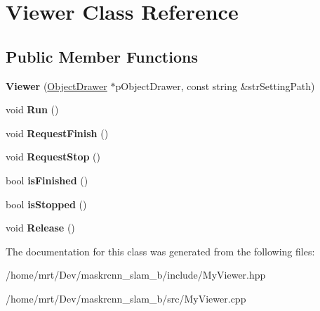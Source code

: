 \hypertarget{classViewer}{}\section{Viewer Class Reference}
\label{classViewer}
\subsection*{Public Member Functions}
\begin{DoxyCompactItemize}
\item 
{\bfseries Viewer} (\hyperlink{classObjectDrawer}{Object\+Drawer} $\ast$p\+Object\+Drawer, const string \&str\+Setting\+Path)\hypertarget{classViewer_a530a83e4c12b0696bcf13edbe3c44b7a}{}\label{classViewer_a530a83e4c12b0696bcf13edbe3c44b7a}

\item 
void {\bfseries Run} ()\hypertarget{classViewer_a3d4222d62773f3e5fc76549802904881}{}\label{classViewer_a3d4222d62773f3e5fc76549802904881}

\item 
void {\bfseries Request\+Finish} ()\hypertarget{classViewer_ad38e3739f5cc89f659c04a66eadf038a}{}\label{classViewer_ad38e3739f5cc89f659c04a66eadf038a}

\item 
void {\bfseries Request\+Stop} ()\hypertarget{classViewer_a018381d2908442c9bbe507ebb07cee39}{}\label{classViewer_a018381d2908442c9bbe507ebb07cee39}

\item 
bool {\bfseries is\+Finished} ()\hypertarget{classViewer_a2639be157c5d30ac92f95addf50f57b8}{}\label{classViewer_a2639be157c5d30ac92f95addf50f57b8}

\item 
bool {\bfseries is\+Stopped} ()\hypertarget{classViewer_a743f485e0b9583d7fdaec7ef4d407faf}{}\label{classViewer_a743f485e0b9583d7fdaec7ef4d407faf}

\item 
void {\bfseries Release} ()\hypertarget{classViewer_a49ac38b7d837b9ce753a5ef1d6109157}{}\label{classViewer_a49ac38b7d837b9ce753a5ef1d6109157}

\end{DoxyCompactItemize}


The documentation for this class was generated from the following files\+:\begin{DoxyCompactItemize}
\item 
/home/mrt/\+Dev/maskrcnn\+\_\+slam\+\_\+b/include/My\+Viewer.\+hpp\item 
/home/mrt/\+Dev/maskrcnn\+\_\+slam\+\_\+b/src/My\+Viewer.\+cpp\end{DoxyCompactItemize}
